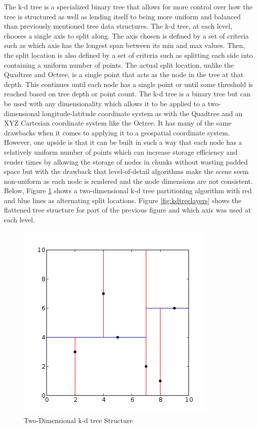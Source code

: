 The k-d tree is a specialized binary tree that allows for more control over how
the tree is structured as well as lending itself to being more uniform and
balanced than previously mentioned tree data structures. The k-d tree, at each
level, chooses a single axis to split along. The axis chosen is defined by a set
of criteria such as which axis has the longest span between its min and max
values. Then, the split location is also defined by a set of criteria such as
splitting each side into containing a uniform number of points. The actual split
location, unlike the Quadtree and Octree, is a single point that acts as the
node in the tree at that depth. This continues until each node has a single
point or until some threshold is reached based on tree depth or point count. The
k-d tree is a binary tree but can be used with any dimensionality which allows
it to be applied to a two-dimensional longitude-latitude coordinate system as
with the Quadtree and an XYZ Cartesian coordinate system like the Octree. It has
many of the same drawbacks when it comes to applying it to a geospatial
coordinate system. However, one upside is that it can be built in such a way
that each node has a relatively uniform number of points which can increase
storage efficiency and render times by allowing the storage of nodes in chunks
without wasting padded space but with the drawback that level-of-detail
algorithms make the scene seem non-uniform as each node is rendered and the node
dimensions are not consistent. Below, Figure \ref{fig:kdtree2d} shows a
two-dimensional k-d tree partitioning algorithm with red and blue lines as alternating split locations.
Figure \ref{fig:kdtreelayers} shows the flattened tree structure for part of the
previous figure and which axis was used at each level.

\begin{figure}[htb]
\begin{center}
\includegraphics[width=.5\linewidth]{images/kdtree_2d.png}
\end{center}
\caption{Two-Dimensional k-d tree Structure \cite{12_kdtree_2d.svg}}
\label{fig:kdtree2d}
\end{figure}

